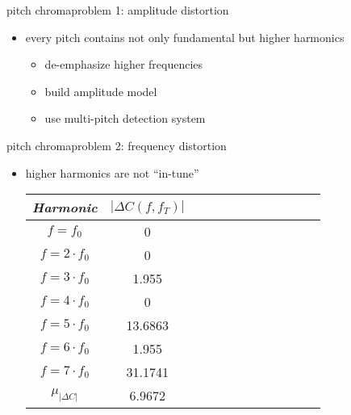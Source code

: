         \begin{frame}{pitch chroma}{problem 1: amplitude distortion}
            \vspace{-3mm}
            \begin{itemize}
                \item	every pitch contains not only fundamental but higher harmonics
                    \begin{itemize}
                        \item<2->	[$\Rightarrow$]	de-emphasize higher frequencies
                        \item<2->	[$\Rightarrow$]	build amplitude model
                        \item<2->	[$\Rightarrow$]	use multi-pitch detection system
                    \end{itemize}
            \end{itemize}
        \end{frame}
        \begin{frame}{pitch chroma}{problem 2: frequency distortion}
            \begin{itemize}
                \item	higher harmonics are not ``in-tune''
                \begin{table}
                    \centering
                    \begin{tabular}{cccccccccccc} %
                        \\ \hline
                        \bf{\emph{Harmonic}}	 & \bf{\emph{$|\Delta C(f,f_T)|$}}\\ 
                         \hline
                        \bf{$f = f_0$}	 & 0\\
                        \bf{$f = 2\cdot f_0$}	 & 0\\
                        \bf{$f = 3\cdot f_0$}	 & 1.955\\
                        \bf{$f = 4\cdot f_0$}	 & 0\\
                        \bf{$f = 5\cdot f_0$}	 & 13.6863\\
                        \bf{$f = 6\cdot f_0$}	 & 1.955\\
                        \bf{$f = 7\cdot f_0$}	 & 31.1741\\
                        \hline
                        \bf{$\mu_{|\Delta C|}$}	 & 6.9672\\
                    \end{tabular}
                \end{table}
            \end{itemize}
        \end{frame}

